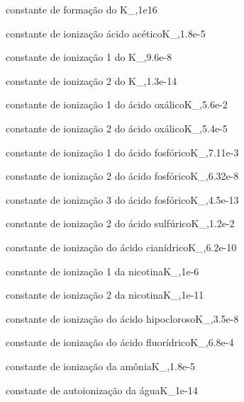 {constante de formação do }{K_{,}}{1e16}{}

%                                              
%                                              

{constante de ionização ácido acético}{K_{,}}{1.8e-5}{}

{constante de ionização 1 do }{K_{,}}{9.6e-8}{}

{constante de ionização 2 do }{K_{,}}{1.3e-14}{}

{constante de ionização 1 do ácido oxálico}{K_{,}}{5.6e-2}{}

{constante de ionização 2 do ácido oxálico}{K_{,}}{5.4e-5}{}

{constante de ionização 1 do ácido fosfórico}{K_{,}}{7.11e-3}{}

{constante de ionização 2 do ácido fosfórico}{K_{,}}{6.32e-8}{}

{constante de ionização 3 do ácido fosfórico}{K_{,}}{4.5e-13}{}

{constante de ionização 2 do ácido sulfúrico}{K_{,}}{1.2e-2}{}

{constante de ionização do ácido cianídrico}{K_{,}}{6.2e-10}{}

{constante de ionização 1 da nicotina}{K_{,}}{1e-6}{}

{constante de ionização 2 da nicotina}{K_{,}}{1e-11}{}

{constante de ionização do ácido hipocloroso}{K_{,}}{3.5e-8}{}

{constante de ionização do ácido fluorídrico}{K_{,}}{6.8e-4}{}

{constante de ionização da amônia}{K_{,}}{1.8e-5}{}

{constante de autoionização da água}{K_{}}{1e-14}{}

